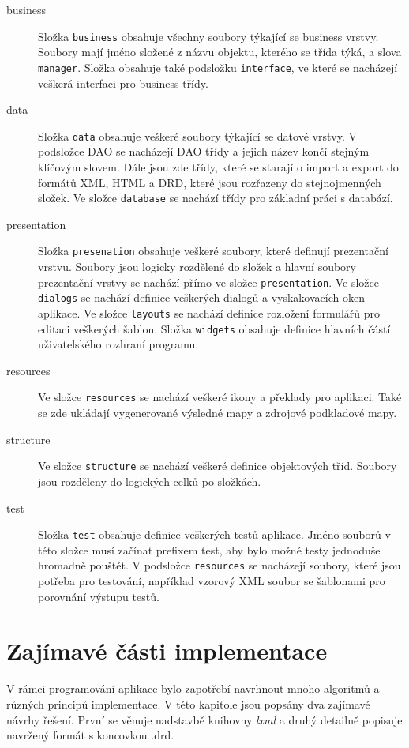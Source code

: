 \documentclass[thesis=B,czech]{resources/FITthesis}[2012/06/26]
\begin{document}
\begin{description}
\item[business] Složka \texttt{business} obsahuje všechny soubory týkající se business vrstvy. Soubory mají jméno složené z názvu objektu, kterého se třída týká, a slova \texttt{manager}. Složka obsahuje také podsložku \texttt{interface}, ve které se nacházejí veškerá interfaci pro business třídy.

\item[data] Složka \texttt{data} obsahuje veškeré soubory týkající se datové vrstvy. V podsložce DAO se nacházejí DAO třídy a jejich název končí stejným klíčovým slovem. Dále jsou zde třídy, které se starají o import a export do formátů XML, HTML a DRD, které jsou rozřazeny do stejnojmenných složek. Ve složce \texttt{database} se nachází třídy pro základní práci s databází.

\item[presentation]Složka \texttt{presenation} obsahuje veškeré soubory, které definují prezentační vrstvu. Soubory jsou logicky rozdělené do složek a hlavní soubory prezentační vrstvy se nachází přímo ve složce \texttt{presentation}. Ve složce \texttt{dialogs} se nachází definice veškerých dialogů a vyskakovacích oken aplikace. Ve složce \texttt{layouts} se nachází definice rozložení formulářů pro editaci veškerých šablon. Složka \texttt{widgets} obsahuje definice hlavních částí uživatelského rozhraní programu.

\item[resources] Ve složce \texttt{resources} se nachází veškeré ikony a překlady pro aplikaci. Také se zde ukládají vygenerované výsledné mapy a zdrojové podkladové mapy.

\item[structure] Ve složce \texttt{structure} se nachází veškeré definice objektových tříd. Soubory jsou rozděleny do logických celků po složkách.

\item[test] Složka \texttt{test} obsahuje definice veškerých testů aplikace. Jméno souborů v této složce musí začínat prefixem test, aby bylo možné testy jednoduše hromadně pouštět. V podsložce \texttt{resources} se nacházejí soubory, které jsou potřeba pro testování, například vzorový XML soubor se šablonami pro porovnání výstupu testů.
\end{description}

\section{Zajímavé části implementace}
V rámci programování aplikace bylo zapotřebí navrhnout mnoho algoritmů a různých principů implementace. V této kapitole jsou popsány dva zajímavé návrhy řešení. První se věnuje nadstavbě knihovny \textit{lxml} a druhý detailně popisuje navržený formát s koncovkou .drd.
\end{document}
